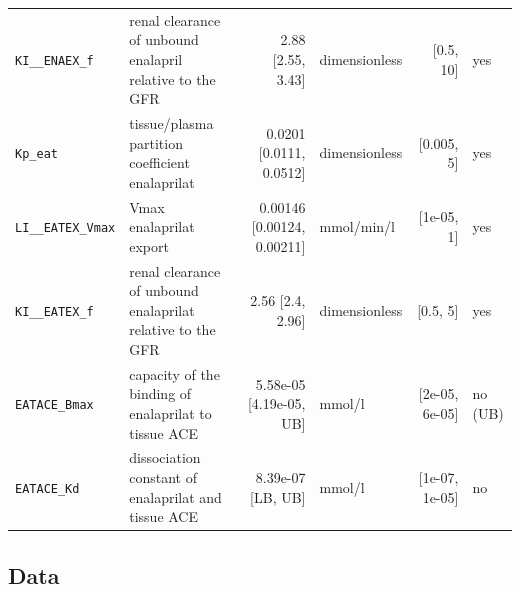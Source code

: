 \documentclass{article}
\begin{document}
\begin{longtable}{llrlrl}
\texttt{KI\_\_ENAEX\_f} & renal clearance of unbound enalapril relative to the GFR & 2.88 [2.55, 3.43] & dimensionless & [0.5, 10] & yes \\
\texttt{Kp\_eat} & tissue/plasma partition coefficient enalaprilat & 0.0201 [0.0111, 0.0512] & dimensionless & [0.005, 5] & yes \\
\texttt{LI\_\_EATEX\_Vmax} & Vmax enalaprilat export & 0.00146 [0.00124, 0.00211] & mmol/min/l & [1e-05, 1] & yes \\
\texttt{KI\_\_EATEX\_f} & renal clearance of unbound enalaprilat relative to the GFR & 2.56 [2.4, 2.96] & dimensionless & [0.5, 5] & yes \\
\texttt{EATACE\_Bmax} & capacity of the binding of enalaprilat to tissue ACE & 5.58e-05 [4.19e-05, UB] & mmol/l & [2e-05, 6e-05] & no (UB) \\
\texttt{EATACE\_Kd} & dissociation constant of enalaprilat and tissue ACE & 8.39e-07 [LB, UB] & mmol/l & [1e-07, 1e-05] & no \\
\end{longtable}

\subsection{Data}
\end{document}
